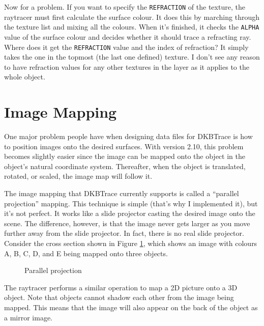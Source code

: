 Now for a problem.  If you want to specify the
{\tt REFRACTION} of the
texture, the raytracer must first calculate the surface colour.  It
does this by marching through the texture list and mixing all the
colours.  When it's finished, it checks the {\tt ALPHA}
value of the
surface colour and decides whether it should trace a refracting ray.
Where does it get the {\tt REFRACTION} value and the index of
refraction?  It simply takes the one in the topmost (the last one
defined) texture.  I don't see any reason to have refraction values
for any other textures in the layer as it applies to the whole object.

\section{Image Mapping}

One major problem people have when designing data files for DKBTrace is how to
position images onto the desired surfaces.  With version 2.10, this problem
becomes slightly easier since the image can be mapped onto the object in the
object's natural coordinate system.  Thereafter, when the object is
translated, rotated, or scaled, the image map will follow it.

The image mapping that DKBTrace currently supports is called a
``parallel projection''%
 mapping.  This technique is simple (that's why
I implemented it), but it's not perfect.  It works like a slide
projector casting the desired image onto the scene.  The difference,
however, is that the image never gets larger as you move further away
from the slide projector.  In fact, there is no real slide projector.
Consider the cross section shown in Figure \ref{project}, which
shows an image with colours A, B, C, D, and E being mapped onto three
objects.
\begin{figure}[htbp]
\begin{centering}

\caption{Parallel projection}
\label{project}
\end{centering}
\end{figure}
The raytracer performs a similar operation
to map a 2D picture onto a 3D object.  Note that objects cannot shadow each
other from the image being mapped.  This means that the image will also appear
on the back of the object as a mirror image.

